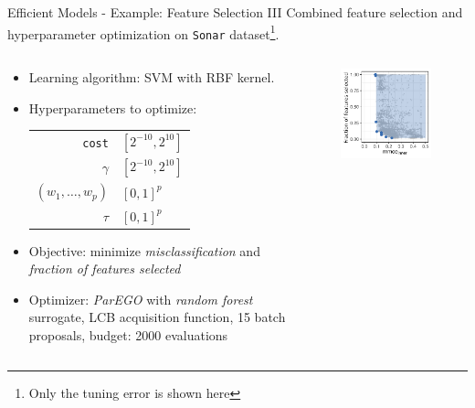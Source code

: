 \begin{frame}{Efficient Models - Example: Feature Selection III}
    Combined feature selection and hyperparameter optimization on \texttt{Sonar} dataset\footnote{Only the tuning error is shown here}.
\begin{columns}
\begin{column}{0.65\textwidth}
  \begin{itemize}
    \item Learning algorithm: SVM with RBF kernel.
    \item Hyperparameters to optimize: \\
    \begin{tabular}{rl}
    \texttt{cost} & $[2^{-10}, 2^{10}]$ \\
    $\gamma$ & $[2^{-10}, 2^{10}]$ \\
    $(w_1, \ldots, w_p)$ & $[0,1]^p$ \\
    $\tau$ & $[0,1]^p$ \\
    \end{tabular}
    \item Objective: minimize \emph{misclassification} and \emph{fraction of features selected}
    \item Optimizer: \emph{ParEGO} with \emph{random forest} surrogate, LCB acquisition function, 15 batch proposals, budget: 2000 evaluations
  \end{itemize}
\end{column}%
\begin{column}{0.35\textwidth}

  \begin{figure}
    \centering
    \includegraphics[width=\linewidth]{images/mosmafs_sonar_eval_domHV.pdf}
  \end{figure}

\end{column}
\end{columns}
\end{frame}

